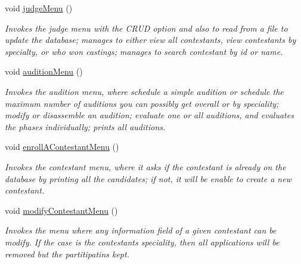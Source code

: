 \begin{DoxyCompactItemize}
void \hyperlink{class_company_m_s_ab0f02c294f82400a7874d960908dd01f}{judge\+Menu} ()
\begin{DoxyCompactList}\small\item\em Invokes the judge menu with the C\+R\+UD option and also to read from a file to update the database; manages to either view all contestants, view contestants by specialty, or who won castings; manages to search contestant by id or name. \end{DoxyCompactList}\item 
\mbox{\label{class_company_m_s_a9a98c34c80840d8f04b0fce65288e8b6}} 
void \hyperlink{class_company_m_s_a9a98c34c80840d8f04b0fce65288e8b6}{audition\+Menu} ()
\begin{DoxyCompactList}\small\item\em Invokes the audition menu, where schedule a simple audition or schedule the maximum number of auditions you can possibly get overall or by speciality; modify or disassemble an audition; evaluate one or all auditions, and evaluates the phases individually; prints all auditions. \end{DoxyCompactList}\item 
\mbox{\label{class_company_m_s_a177187aa99d595796b19afbfc3581175}} 
void \hyperlink{class_company_m_s_a177187aa99d595796b19afbfc3581175}{enroll\+A\+Contestant\+Menu} ()
\begin{DoxyCompactList}\small\item\em Invokes the contestant menu, where it asks if the contestant is already on the database by printing all the candidates; if not, it will be enable to create a new contestant. \end{DoxyCompactList}\item 
\mbox{\label{class_company_m_s_a3293e5268055b1b293c0379973db3212}} 
void \hyperlink{class_company_m_s_a3293e5268055b1b293c0379973db3212}{modify\+Contestant\+Menu} ()
\begin{DoxyCompactList}\small\item\em Invokes the menu where any information field of a given contestant can be modify. If the case is the contestant\textquotesingle{}s speciality, then all applications will be removed but the partitipatins kept. \end{DoxyCompactList}\item 
\mbox{\label{class_company_m_s_ae02ea0e36a16b4dd6b1674a39e60d10c}} 

\end{DoxyCompactItemize}
